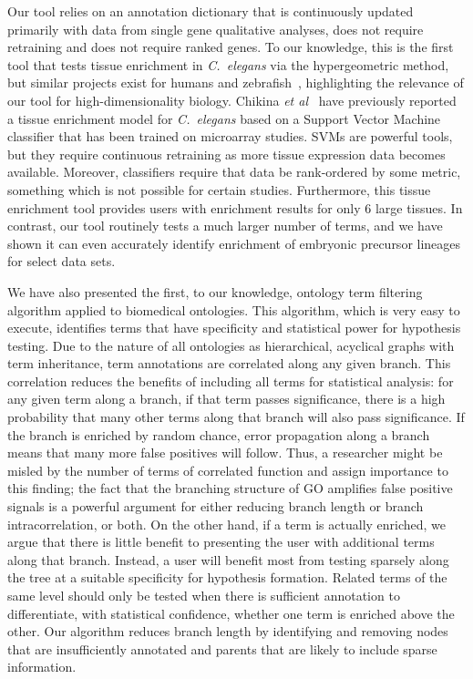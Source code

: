 Our tool relies on an annotation dictionary that is continuously updated
primarily with data from single gene qualitative analyses, does not require
retraining and does not require ranked genes. To our knowledge, this is the first
tool that tests tissue enrichment  in \emph{C.~elegans} via the hypergeometric
method, but similar projects exist for humans and zebrafish~\cite{Lee2013,
Prykhozhij2013}, highlighting the relevance of our tool for high-dimensionality
biology. Chikina \emph{et al}~\cite{Chikina2009} have previously reported a
tissue enrichment model for \emph{C.~elegans }based on a Support Vector Machine
classifier that has been trained on microarray studies. SVMs are powerful tools,
but they require continuous retraining as more tissue expression data becomes
available. Moreover, classifiers require that data be rank-ordered by some metric,
something which is not possible for certain studies. Furthermore, this tissue
enrichment tool provides users with enrichment results for only 6 large tissues.
In contrast, our tool routinely tests a much larger number of terms, and we have
shown it can even accurately identify enrichment of embryonic precursor lineages
for select data sets.

We have also presented the first, to our knowledge, ontology term filtering
algorithm applied to biomedical ontologies. This algorithm, which is very easy
to execute, identifies terms that have specificity and statistical power for
hypothesis testing. Due to the nature of all ontologies as hierarchical, acyclical
graphs with term inheritance, term annotations are correlated along any given
branch. This correlation reduces the benefits of including all terms for
statistical analysis: for any given term along a branch, if that term passes
significance, there is a high probability that many other terms along that branch
will also pass significance. If the branch is enriched by random chance, error
propagation along a branch means that many more false positives will follow.
Thus, a researcher might be misled by the number of terms of correlated function
and assign importance to this finding; the fact that the branching structure of
GO amplifies false positive signals is a powerful argument for either reducing
branch length or branch intracorrelation, or both. On the other hand, if a term
is actually enriched, we argue that there is little benefit to presenting the
user with additional terms along that branch. Instead, a user will benefit most
from testing sparsely along the tree at a suitable specificity for hypothesis
formation. Related terms of the same level should only be tested when there is
sufficient annotation to differentiate, with statistical confidence, whether one
term is enriched above the other. Our algorithm reduces branch length by
identifying and removing nodes that are insufficiently annotated and parents
that are likely to include sparse information.


